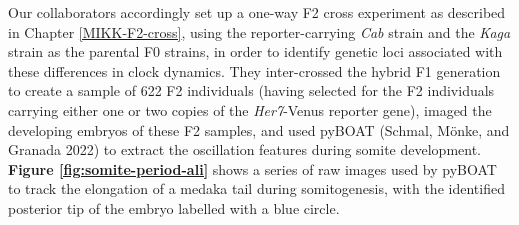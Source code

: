\documentclass[
]{book}
\begin{document}
Our collaborators accordingly set up a one-way F2 cross experiment as described in Chapter \ref{MIKK-F2-cross}, using the reporter-carrying \emph{Cab} strain and the \emph{Kaga} strain as the parental F0 strains, in order to identify genetic loci associated with these differences in clock dynamics. They inter-crossed the hybrid F1 generation to create a sample of 622 F2 individuals (having selected for the F2 individuals carrying either one or two copies of the \emph{Her7}-Venus reporter gene), imaged the developing embryos of these F2 samples, and used pyBOAT (Schmal, Mönke, and Granada 2022) to extract the oscillation features during somite development. \textbf{Figure \ref{fig:somite-period-ali}} shows a series of raw images used by pyBOAT to track the elongation of a medaka tail during somitogenesis, with the identified posterior tip of the embryo labelled with a blue circle.
\end{document}
